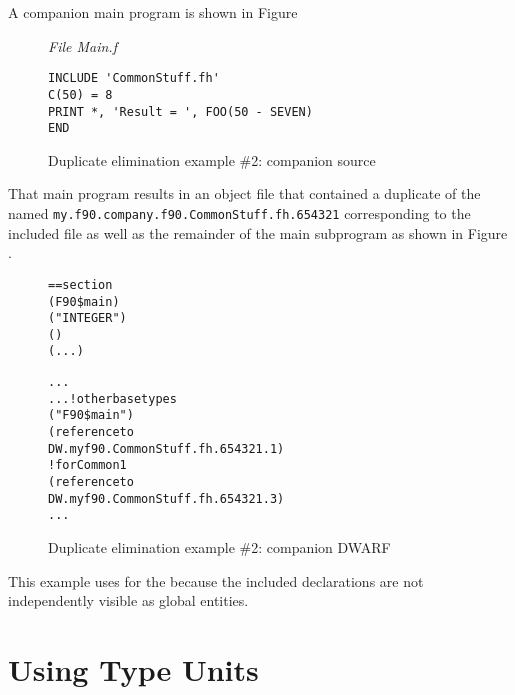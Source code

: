 A companion main program is shown in 
Figure 

\begin{figure}
\textit{File Main.f} 
\begin{lstlisting}[numbers=none]
INCLUDE 'CommonStuff.fh'
C(50) = 8
PRINT *, 'Result = ', FOO(50 - SEVEN)
END
\end{lstlisting}
\caption{Duplicate elimination example \#2: companion source }
\label{fig:duplicateeliminationexample2companionsource}
\end{figure}

That main program results in an object file that
contained a duplicate of the  named
\texttt{my.f90.company.f90.CommonStuff.fh.654321} 
corresponding to the
included file as well as the remainder of the main subprogram
as shown in 
Figure .

\begin{figure}
\begin{dwflisting}
\begin{alltt}
== section \dotdebuginfo{}
    \DWTAGcompileunit
        \DWATname(F90\$main)
        \DWTAGbasetype
            \DWATname("INTEGER")
            \DWATencoding(\DWATEsigned)
            \DWATbytesize(...)

        \DWTAGbasetype
            ...
        ...  ! other base types
        \DWTAGsubprogram
            \DWATname("F90\$main")
            \DWTAGimportedunit
                \DWATimport(reference to
                    DW.myf90.CommonStuff.fh.654321.1)
            \DWTAGcommoninclusion ! for Common1
                \DWATcommonreference(reference to
                    DW.myf90.CommonStuff.fh.654321.3)
            ...
\end{alltt}
\end{dwflisting}
\caption{Duplicate elimination example \#2: companion DWARF }
\label{fig:duplicateeliminationexample2companiondwarf}
\end{figure}

This example uses \DWTAGpartialunit{} for the 
because the included declarations are not independently
visible as global entities.


\section{Using Type Units}
\label{app:usingtypeunits}

